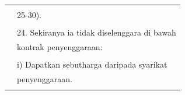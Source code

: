 \documentclass[
]{article}
\begin{document}
\begin{longtable}[]{@{}ll@{}}
\begin{minipage}[t]{0.71\columnwidth}
\end{minipage}\tabularnewline
\begin{minipage}[t]{0.23\columnwidth}\raggedright
\strut
\end{minipage} & \begin{minipage}[t]{0.71\columnwidth}\raggedright
25-30).\strut
\end{minipage}\tabularnewline
\begin{minipage}[t]{0.23\columnwidth}\raggedright
\strut
\end{minipage} & \begin{minipage}[t]{0.71\columnwidth}\raggedright
\strut
\end{minipage}\tabularnewline
\begin{minipage}[t]{0.23\columnwidth}\raggedright
\strut
\end{minipage} & \begin{minipage}[t]{0.71\columnwidth}\raggedright
24. Sekiranya ia tidak diselenggara di bawah\strut
\end{minipage}\tabularnewline
\begin{minipage}[t]{0.23\columnwidth}\raggedright
\strut
\end{minipage} & \begin{minipage}[t]{0.71\columnwidth}\raggedright
kontrak penyenggaraan:\strut
\end{minipage}\tabularnewline
\begin{minipage}[t]{0.23\columnwidth}\raggedright
\strut
\end{minipage} & \begin{minipage}[t]{0.71\columnwidth}\raggedright
\strut
\end{minipage}\tabularnewline
\begin{minipage}[t]{0.23\columnwidth}\raggedright
\strut
\end{minipage} & \begin{minipage}[t]{0.71\columnwidth}\raggedright
i) Dapatkan sebutharga daripada syarikat\strut
\end{minipage}\tabularnewline
\begin{minipage}[t]{0.23\columnwidth}\raggedright
\strut
\end{minipage} & \begin{minipage}[t]{0.71\columnwidth}\raggedright
penyenggaraan.\strut
\end{minipage}\tabularnewline
\begin{minipage}[t]{0.23\columnwidth}\raggedright
\strut
\end{minipage} & \begin{minipage}[t]{0.71\columnwidth}\raggedright

\end{minipage}
\end{longtable}
\end{document}
